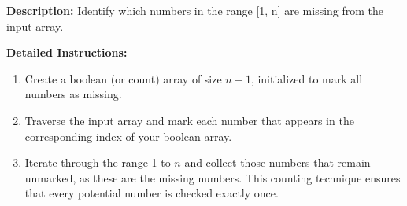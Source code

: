 \textbf{Description:} Identify which numbers in the range [1, n] are missing from the input array.

\textbf{Detailed Instructions:}
\begin{enumerate}
    \item Create a boolean (or count) array of size \(n+1\), initialized to mark all numbers as missing.
    \item Traverse the input array and mark each number that appears in the corresponding index of your boolean array.
    \item Iterate through the range 1 to \(n\) and collect those numbers that remain unmarked, as these are the missing numbers. This counting technique ensures that every potential number is checked exactly once.
\end{enumerate}